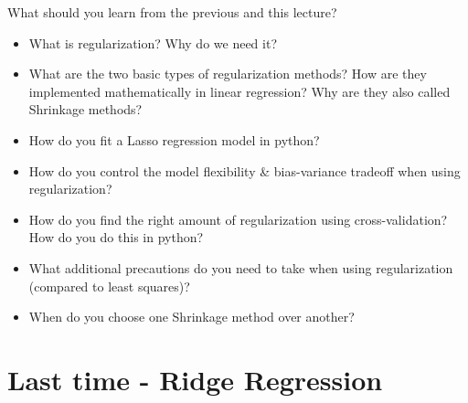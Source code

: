 \documentclass[aspectratio=169,usenames,dvipsnames]{beamer}
\begin{document}
\begin{frame}[t]{What should you learn from the previous and this lecture?}
	\begin{itemize}
		\item What is regularization? Why do we need it?
		\item What are the two basic types of regularization methods? How are they implemented mathematically in linear regression? Why are they also called Shrinkage methods?
		\item How do you fit a Lasso regression model in python?
		\item How do you control the model flexibility \& bias-variance tradeoff when using regularization?
		\item How do you find the right amount of regularization using cross-validation? How do you do this in python?
		\item What additional precautions do you need to take when using regularization (compared to least squares)?
		\item When do you choose one Shrinkage method over another?
	\end{itemize}
\end{frame}

\section{Last time - Ridge Regression}
\end{document}
